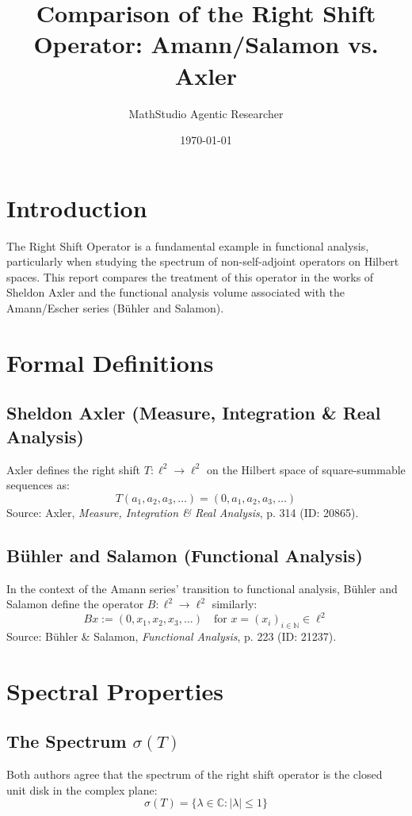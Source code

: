 \documentclass{article}
\title{Comparison of the Right Shift Operator: Amann/Salamon vs. Axler}
\author{MathStudio Agentic Researcher}
\date{\today}
\begin{document}
\maketitle
\section{Introduction}
The Right Shift Operator is a fundamental example in functional analysis, particularly when studying the spectrum of non-self-adjoint operators on Hilbert spaces. This report compares the treatment of this operator in the works of Sheldon Axler and the functional analysis volume associated with the Amann/Escher series (Bühler and Salamon).

\section{Formal Definitions}

\subsection{Sheldon Axler (Measure, Integration \& Real Analysis)}
Axler defines the right shift $T: \ell^2 \to \ell^2$ on the Hilbert space of square-summable sequences as:
\[ T(a_1, a_2, a_3, \ldots) = (0, a_1, a_2, a_3, \ldots) \]
Source: Axler, \textit{Measure, Integration \& Real Analysis}, p. 314 (ID: 20865).

\subsection{Bühler and Salamon (Functional Analysis)}
In the context of the Amann series' transition to functional analysis, Bühler and Salamon define the operator $B: \ell^2 \to \ell^2$ similarly:
\[ Bx := (0, x_1, x_2, x_3, \ldots) \quad \text{for } x = (x_i)_{i \in \mathbb{N}} \in \ell^2 \]
Source: Bühler \& Salamon, \textit{Functional Analysis}, p. 223 (ID: 21237).

\section{Spectral Properties}

\subsection{The Spectrum $\sigma(T)$}
Both authors agree that the spectrum of the right shift operator is the closed unit disk in the complex plane:
\[ \sigma(T) = \{ \lambda \in \mathbb{C} : |\lambda| \le 1 \} \]
\end{document}

